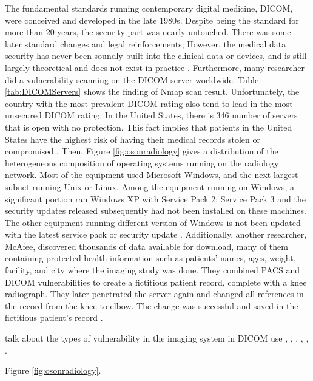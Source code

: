 \documentclass[pdf,bookmarks,colorlinks=true]{IEEEtran}
\begin{document}
The fundamental standards running contemporary digital medicine, DICOM, were conceived and developed in the late 1980s. Despite being the standard for more than 20 years, the security part was nearly untouched. There was some later standard changes and legal reinforcements; However, the medical data security has never been soundly built into the clinical data or devices, and is still largely theoretical and does not exist in practice  \cite{ferrara2019cybersecurity} \cite{ma2019medical} \cite{stites2016secure}. Furthermore, many researcher did a vulnerability scanning on the DICOM server worldwide. Table \ref{tab:DICOMServers} shows the finding of Nmap scan result. Unfortunately, the country with the most prevalent DICOM rating also tend to lead in the most unsecured DICOM rating. In the United States, there is 346 number of servers that is open with no protection. This fact implies that patients in the United States have the highest risk of having their medical records stolen or compromised \cite{stites2016secure}. Then, Figure \ref{fig:osonradiology} gives a distribution of the heterogeneous composition of operating systems running on the radiology network. Most of the equipment used Microsoft Windows, and the next largest subnet running Unix or Linux. Among the equipment running on Windows, a significant portion ran Windows XP with Service Pack 2; Service Pack 3 and the security updates released subsequently had not been installed on these machines. The other equipment running different version of Windows is not been updated with the latest service pack or security update \cite{moses2015lack}.  Additionally, another researcher, McAfee, discovered thousands of data available for download, many of them containing protected health information such as patients' names, ages, weight, facility, and city where the imaging study was done. They combined PACS and DICOM vulnerabilities to create a fictitious patient record, complete with a knee radiograph. They later penetrated the server again and changed all references in the record from the knee to elbow. The change was successful and saved in the fictitious patient's record \cite{ferrara2019cybersecurity}.

talk about the types of vulnerability in the imaging system in DICOM use \cite{InformationSecurityonDiagnosticImagingSystem}, \cite{stites2016secure}, \cite{mahler2018know}, \cite{ma2019medical}, \cite{ferrara2019cybersecurity}, \cite{stites2016secure}.

Figure \ref{fig:osonradiology}. 
\end{document}
